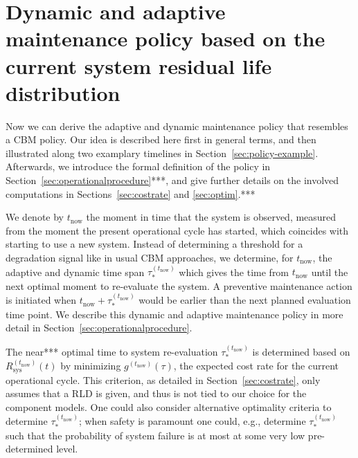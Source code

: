 \documentclass[authoryear]{elsarticle}
\def\tnow{t_\text{now}}
\newcommand{\Rsysnow}{R^{(t_\text{now})}_\text{sys}}
\newcommand{\gnow}{g^{(\tnow)}}
\newcommand{\tausnow}{\tau_*^{(\tnow)}}
\begin{document}
\section{Dynamic and adaptive maintenance policy based on the current system residual life distribution}
\label{sec:policy}

Now we can derive the adaptive and dynamic maintenance policy
that resembles a CBM policy.
Our idea is described here first in general terms,
and then illustrated along two examplary timelines in Section~\ref{sec:policy-example}.
Afterwards, we introduce the formal definition of the policy in Section~\ref{sec:operationalprocedure}***,
and give further details on the involved computations in Sections~\ref{sec:costrate} and \ref{sec:optim}.***

We denote by $\tnow$ the moment in time that the system is observed,
measured from the moment the present operational cycle has started,
which coincides with starting to use a new system.
Instead of determining a threshold for a degradation signal like in usual CBM approaches,
we determine, for $\tnow$, the adaptive and dynamic time span $\tausnow$
which gives the time from $\tnow$ until the next optimal moment to re-evaluate the system.
A preventive maintenance action is initiated
when $\tnow + \tausnow$ would be earlier than the next planned evaluation time point.
We describe this dynamic and adaptive maintenance policy in more detail in Section~\ref{sec:operationalprocedure}.

The near*** optimal time to system re-evaluation $\tausnow$ is determined based on $\Rsysnow(t)$
by minimizing $\gnow(\tau)$, the expected cost rate for the current operational cycle.
This criterion, as detailed in Section~\ref{sec:costrate},
only assumes that a RLD is given,
and thus is not tied to our choice for the component models.
One could also consider alternative optimality criteria to determine $\tausnow$;
when safety is paramount one could, e.g., determine $\tausnow$ such that
the probability of system failure is at most at some very low pre-determined level.
\end{document}
